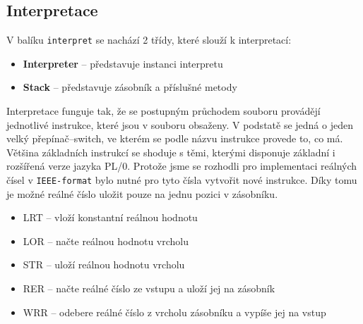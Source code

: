 \documentclass[
12pt,
a4paper,
pdftex,
czech,
titlepage
]{report}
\begin{document}
\subsection{Interpretace}
V balíku \texttt{interpret} se nachází 2 třídy, které slouží k interpretací:
\begin{itemize}
\item \textbf{Interpreter} -- představuje instanci interpretu 
\item \textbf{Stack} -- představuje zásobník a příslušné metody 
\end{itemize}

Interpretace funguje tak, že se postupným průchodem souboru provádějí jednotlivé instrukce, které jsou v souboru obsaženy. V podstatě se jedná o jeden velký přepínač--switch, ve kterém se podle názvu instrukce provede to, co má. Většina základních instrukcí se shoduje s těmi, kterými disponuje základní i rozšířená verze jazyka PL/0. Protože jsme se rozhodli pro implementaci reálných čísel v \texttt{IEEE-format} bylo nutné pro tyto čísla vytvořit nové instrukce. Díky tomu je možné reálné číslo uložit pouze na jednu pozici v zásobníku.
\begin{itemize}
\item LRT -- vloží konstantní reálnou hodnotu 
\item LOR -- načte reálnou hodnotu vrcholu
\item STR -- uloží reálnou hodnotu vrcholu
\item RER -- načte reálné číslo ze vstupu a uloží jej na zásobník
\item WRR -- odebere reálné číslo z vrcholu zásobníku a vypíše jej na vstup
\end{itemize}
\end{document}
